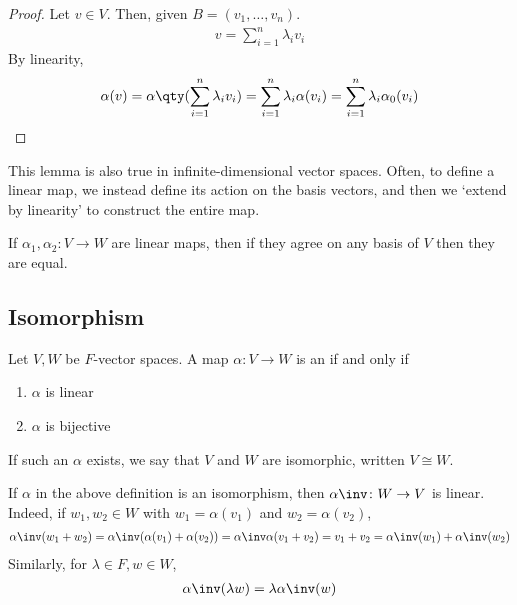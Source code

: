 \begin{proof}
    Let $v \in V$.
    Then, given $B = (v_1, \dots, v_n)$.
    \begin{align*}
        v = \sum_{i=1}^n \lambda_i v_i
    \end{align*}
    By linearity,
    \begin{align*}
        \alpha(v) = \alpha\qty(\sum_{i=1}^n \lambda_i v_i) = \sum_{i=1}^n \lambda_i \alpha(v_i) = \sum_{i=1}^n \lambda_i \alpha_0(v_i)
    \end{align*}
\end{proof}

\begin{remark}
    This lemma is also true in infinite-dimensional vector spaces.
    Often, to define a linear map, we instead define its action on the basis vectors, and then we `extend by linearity' to construct the entire map.
\end{remark}

\begin{remark}
    If $\alpha_1, \alpha_2 \colon V \to W$ are linear maps, then if they agree on any basis of $V$ then they are equal.
\end{remark}

\subsection{Isomorphism}
\begin{definition}[Isomorphism]
    Let $V, W$ be $F$-vector spaces.
    A map $\alpha \colon V \to W$ is an  if and only if
    \begin{enumerate}
        \item $\alpha$ is linear
        \item $\alpha$ is bijective
    \end{enumerate}
    If such an $\alpha$ exists, we say that $V$ and $W$ are isomorphic, written $V \cong W$.
\end{definition}

\begin{remark}
    If $\alpha$ in the above definition is an isomorphism, then $\alpha\inv \colon W \to V$ is linear.
    Indeed, if $w_1, w_2 \in W$ with $w_1 = \alpha(v_1)$ and $w_2 = \alpha(v_2)$,
    \begin{align*}
        \alpha\inv (w_1 + w_2) = \alpha\inv (\alpha(v_1) + \alpha(v_2)) = \alpha\inv \alpha (v_1 + v_2) = v_1 + v_2 = \alpha\inv(w_1) + \alpha\inv(w_2)
    \end{align*}
    Similarly, for $\lambda \in F, w \in W$,
    \begin{align*}
        \alpha\inv(\lambda w) = \lambda \alpha\inv(w)
    \end{align*}
\end{remark}

